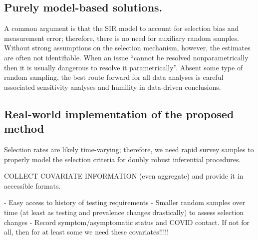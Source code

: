 \documentclass[11pt]{amsart}
\numberwithin{equation}{section}
\theoremstyle{plain}
\begin{document}

\subsection*{Purely model-based solutions.}

A common argument is that the SIR model to account for selection bias and measurement error; therefore, there is no need for auxiliary random samples.  Without strong assumptions on the selection mechanism, however, the estimates are often not identifiable.  When an issue ``cannot be resolved nonparametrically then it is usually dangerous to resolve it parametrically''\citep{CoxHink74}. Absent some type of random sampling, the best route forward for all data analyses is careful associated sensitivity analyses and humility in data-driven conclusions.

\subsection*{Real-world implementation of the proposed method}

Selection rates are likely time-varying; therefore, we need rapid survey samples to properly model the selection criteria for doubly robust inferential procedures.

COLLECT COVARIATE INFORMATION (even aggregate) and provide it in accessible formats.

- Easy access to history of testing requirements
- Smaller random samples over time (at least as testing and prevalence changes drastically) to assess selection changes
- Record symptom/asymptomatic status and COVID contact.  If not for all, then for at least some we need these covariates!!!!!
\end{document}
